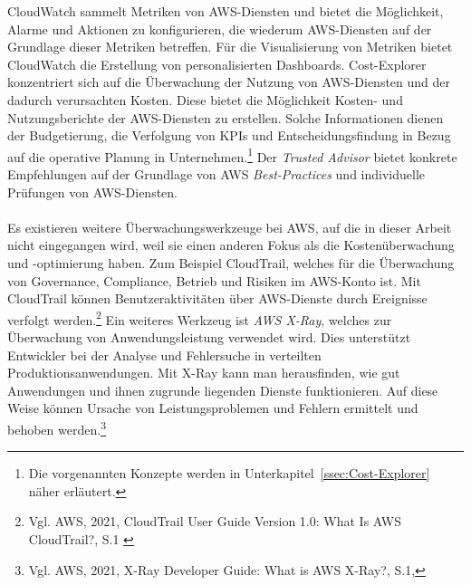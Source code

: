 CloudWatch sammelt Metriken von AWS-Diensten und bietet die Möglichkeit, Alarme und Aktionen zu konfigurieren, die wiederum AWS-Diensten auf der Grundlage dieser Metriken betreffen. Für die Visualisierung von Metriken bietet CloudWatch die Erstellung von personalisierten Dashboards.
Cost-Explorer konzentriert sich auf die Überwachung der Nutzung von AWS-Diensten und der dadurch verursachten Kosten. Diese bietet die Möglichkeit Kosten- und Nutzungsberichte der AWS-Diensten zu erstellen. Solche Informationen dienen der Budgetierung, %
die Verfolgung von KPIs und Entscheidungsfindung in Bezug auf die operative Planung in Unternehmen.\footnote{Die vorgenannten Konzepte werden in Unterkapitel~\ref{ssec:Cost-Explorer} näher erläutert.} %
Der \textit{Trusted Advisor} bietet konkrete Empfehlungen auf der Grundlage von AWS \textit{Best-Practices} und individuelle Prüfungen von AWS-Diensten.
\\\\
Es existieren weitere Überwachungswerkzeuge bei AWS, auf die in dieser Arbeit nicht eingegangen wird, weil sie einen anderen Fokus als die Kostenüberwachung und -optimierung haben. Zum Beispiel CloudTrail, welches für die Überwachung von Governance, Compliance, Betrieb und Risiken im AWS-Konto ist. Mit CloudTrail können Benutzeraktivitäten über AWS-Dienste durch Ereignisse verfolgt werden.\footnote{Vgl. AWS, 2021, CloudTrail User Guide Version 1.0: What Is AWS CloudTrail?, S.1 \cite{AMZ27}} Ein weiteres Werkzeug ist \textit{AWS X-Ray}, welches zur Überwachung von Anwendungsleistung verwendet wird. Dies unterstützt Entwickler bei der Analyse und Fehlersuche in verteilten Produktionsanwendungen. Mit X-Ray kann man herausfinden, wie gut Anwendungen und ihnen zugrunde liegenden Dienste funktionieren. Auf diese Weise können Ursache von Leistungsproblemen und Fehlern ermittelt und behoben werden.\footnote{Vgl. AWS, 2021, X-Ray Developer Guide: What is AWS X-Ray?, S.1\cite{AMZ27},}
\newpage

